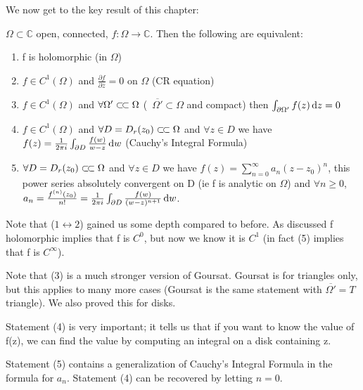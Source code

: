 We now get to the key result of this chapter:

\begin{theorem}
$\Omega \subset \mathbb{C}$ open, connected, $f:\Omega \rightarrow \mathbb{C}$. Then the following are equivalent:

\begin{enumerate}
    \item f is holomorphic (in $\Omega$)
    \item $f\in C^1(\Omega)$ and $\frac{\partial f}{\partial \overline{z}} = 0$ on $\Omega$ (CR equation)
    \item $f\in C^1(\Omega)$ and $\forall \Omega' \ssubset \Omega$ (\, $\overline{\Omega'} \subset \Omega$ and compact) then $\int_{\partial \Omega'} f(z) \dif z = 0$
    \item $f\in C^1(\Omega)$ and $\forall D = D_r(z_0) \ssubset \Omega$ and $\forall z\in D$ we have $f(z) = \frac{1}{2\pi i} \int_{\partial D} \frac{f(w)}{w-z}  \dif w$ (Cauchy's Integral Formula)
    \item $\forall D = D_r(z_0) \ssubset \Omega$ and $\forall z\in D$ we have $f(z) = \sum_{n=0}^\infty a_n (z-z_0)^n$, this power series absolutely convergent on D (ie f is analytic on $\Omega$) and $\forall n\geq 0$, $a_n = \frac{f^{(n)}(z_0) }{n!} = \frac{1}{2\pi i} \int_{\partial D} \frac{f(w)}{(w-z)^{n+1}}  \dif w$.
\end{enumerate}
\end{theorem}





\begin{note}
Note that ($1 \leftrightarrow 2$) gained us some depth compared to before. As discussed f holomorphic implies that f is $C^0$, but now we know it is $C^1$ (in fact (5) implies that f is $C^\infty$).

Note that (3) is a much stronger version of Goursat. Goursat is for triangles only, but this applies to many more cases (Goursat is the same statement with $\overline{\Omega'}=T$ triangle). We also proved this for disks.

Statement (4) is very important; it tells us that if you want to know the value of f(z), we can find the value by computing an integral on a disk containing z.

Statement (5) contains a generalization of Cauchy's Integral Formula in the formula for $a_n$. Statement (4) can be recovered by letting $n=0$.
\end{note}



